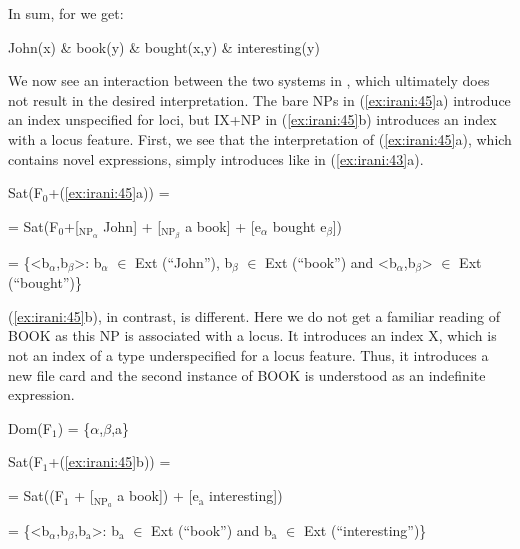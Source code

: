 \documentclass[output=paper,
modfonts
]{langscibook}
\begin{document}
In sum, for  we get:

\begin{exe}

\ex John(x) \& book(y) \& bought(x,y) \& interesting(y)

\end{exe}

We now see an interaction between the two systems in , which ultimately does not result in the desired interpretation. The bare NPs in (\ref{ex:irani:45}a) introduce an index unspecified for loci, but IX+NP in (\ref{ex:irani:45}b) introduces an index with a locus feature. First, we see that the interpretation of (\ref{ex:irani:45}a), which contains novel expressions, simply introduces  like in (\ref{ex:irani:43}a). 

\begin{exe}

\ex Sat(F$_0$+(\ref{ex:irani:45}a)) = \par 
= Sat(F$_0$+[$_{\text{NP}_{\alpha}}$ John] + [$_{\text{NP}_\beta}$ a book] + [e$_{\alpha}$ bought e$_{\beta}$])\par 
= \{<b$_{\alpha}$,b$_{\beta}$>: b$_{\alpha}$ \(\in\) Ext (``John''), b$_{\beta}$ \(\in\) Ext (``book'') and <b$_{\alpha}$,b$_{\beta}$> \(\in\) Ext \\ (``bought'')\}  

\end{exe}

(\ref{ex:irani:45}b), in contrast, is different. Here we do not get a familiar reading of BOOK as this NP is associated with a locus. It introduces an index X, which is not an index of a type underspecified for a locus feature. Thus, it introduces a new file card and the second instance of BOOK is understood as an indefinite expression. 

\begin{exe}

\ex Dom(F$_1$) = \{\(\alpha\),\(\beta\),a\}\par 

Sat(F$_1$+(\ref{ex:irani:45}b)) = \par 
= Sat((F$_1$ + [$_{\text{NP}_{a}}$ a book]) + [e$_\text{a}$ interesting]) \par 
= \{<b$_{\alpha}$,b$_{\beta}$,b$_\text{a}$>: b$_\text{a}$ \(\in\) Ext (``book'') and b$_\text{a}$ \(\in\) Ext (``interesting'')\} \par 

\end{exe}
\end{document}
